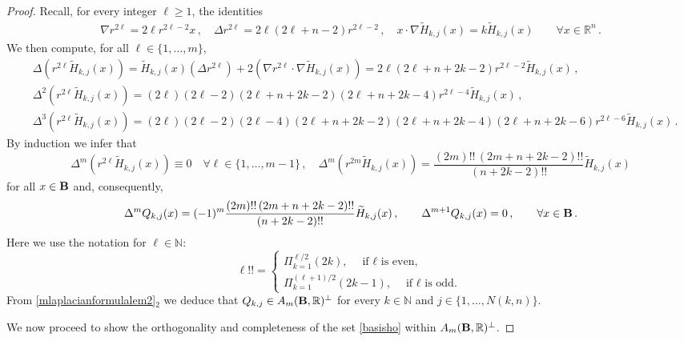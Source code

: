 \documentclass[11pt]{article}
\theoremstyle{plain}
\theoremstyle{definition}
\numberwithin{equation}{section}
\newcommand{\N}{\mathbb{N}}
\newcommand{\B}{{\bf B}}
\begin{document}
\begin{proof}
Recall, for every integer $\ell \geq 1$, the identities
\begin{equation} \label{euler}
\begin{aligned}
\nabla r^{2\ell } = 2\ell  r^{2\ell -2} x \, , \quad \Delta r^{2\ell } = 2\ell  (2\ell  + n - 2) r^{2\ell-2} \, , \quad x \cdot \nabla \widetilde{H}_{k,j}(x) = k \widetilde{H}_{k,j}(x) \qquad \forall x \in \mathbb{R}^{n} \, .
\end{aligned}
\end{equation}
We then compute, for all $\ell \in \{1,\ldots,m\}$,
$$
\begin{aligned}
& \Delta (r^{2\ell} \widetilde{H}_{k,j}(x)) = \widetilde{H}_{k,j}(x) (\Delta r^{2\ell}) + 2 (\nabla r^{2\ell} \cdot \nabla \widetilde{H}_{k,j}(x)) = 2\ell (2\ell + n + 2k - 2)  r^{2\ell-2} \widetilde{H}_{k,j}(x) \, , \\[6pt]
& \Delta^{2} (r^{2\ell} \widetilde{H}_{k,j}(x)) = (2\ell)(2\ell-2)(2\ell + n + 2k - 2)(2\ell + n + 2k - 4) r^{2\ell-4} \widetilde{H}_{k,j}(x) \, , \\[6pt]
& \Delta^{3} (r^{2\ell} \widetilde{H}_{k,j}(x)) = (2\ell)(2\ell-2)(2\ell-4)(2\ell + n + 2k - 2)(2\ell + n + 2k - 4)(2\ell+n+2k-6) r^{2\ell-6} \widetilde{H}_{k,j}(x) \, .
\end{aligned}
$$
By induction we infer that
\begin{equation} \label{mlaplacianformulalem}
\Delta^{m} (r^{2\ell} \widetilde{H}_{k,j}(x)) \equiv 0 \quad \forall \ell \in \{1,\ldots,m-1\} \, , \quad
\Delta^{m} (r^{2m} \widetilde{H}_{k,j}(x)) = \dfrac{(2m)!! \, (2m+n+2k-2)!!}{(n+2k-2)!!} \widetilde{H}_{k,j}(x)
\end{equation}
for all $x \in \B$ and, consequently,
\begin{equation} \label{mlaplacianformulalem2}
\Delta^{m} Q_{k,j}(x) = (-1)^{m} \dfrac{(2m)!! \, (2m+n+2k-2)!!}{(n+2k-2)!!} \widetilde{H}_{k,j}(x)\, ,\qquad\Delta^{m+1} Q_{k,j}(x) = 0\, , \qquad \forall x \in \B \, .
\end{equation}
Here we use the notation for $\ell\in\N$:
$$
\ell!!=\begin{cases}
\Pi_{k=1}^{\ell/2}(2k),\quad \mbox{if $\ell$ is even,}\\[2mm]
\Pi_{k=1}^{(\ell+1)/2}(2k-1),\quad \mbox{if $\ell$ is odd.}
\end{cases}
$$
From \eqref{mlaplacianformulalem2}$_2$ we deduce that $Q_{k,j} \in A_{m}(\B, \mathbb{R})^{\perp}$ for every $k \in \mathbb{N}$ and $j \in \{1,\ldots,N(k,n)\}$.

We now proceed to show the orthogonality and completeness of the set \eqref{basisho} within $A_{m}(\B, \mathbb{R})^{\perp}$.


\end{proof}
\end{document}
